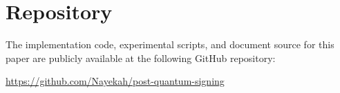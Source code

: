 \section*{Repository}

The implementation code, experimental scripts, and document source for this paper are publicly available at the following GitHub repository:

\begin{center}
\underline{\url{https://github.com/Nayekah/post-quantum-signing}}
\end{center}
